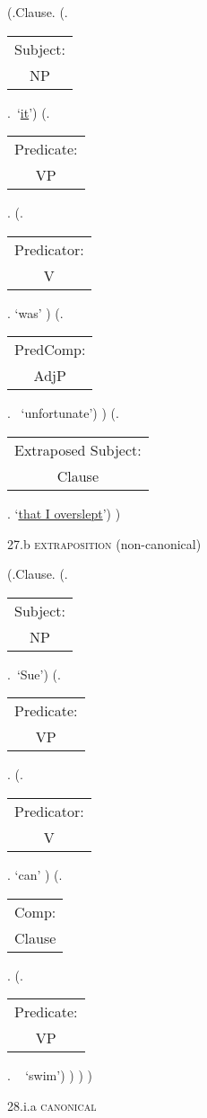 \documentclass[12pt,letterpaper]{article}
\begin{document}
\begin{figure}
	\begin{center}
		\begin{parsetree}
			(.Clause.
			(.\begin{tabular}{c}Subject:\\NP\end{tabular}.~`\underline{it}')
			(.\begin{tabular}{c}Predicate:\\VP\end{tabular}.
			(.\begin{tabular}{c}Predicator:\\V\end{tabular}. `was' )
			(.\begin{tabular}{c}PredComp:\\AdjP\end{tabular}. ~`unfortunate')
			)
			(.\begin{tabular}{c}Extraposed Subject:\\Clause\end{tabular}. `\underline{that I overslept}')
			)
			
			\hfill \break\hfill \break
		\end{parsetree}
		27.b \textsc{extraposition} (non-canonical)
	\end{center}
\end{figure}
\clearpage
\begin{figure}
	\begin{center}
		\begin{parsetree}
			(.Clause.
			(.\begin{tabular}{c}Subject:\\NP\end{tabular}.~`Sue')
			(.\begin{tabular}{c}Predicate:\\VP\end{tabular}.
			(.\begin{tabular}{c}Predicator:\\V\end{tabular}. `can' )
			(.\begin{tabular}{c}Comp:\\Clause\end{tabular}.
			(.\begin{tabular}{c}Predicate:\\VP\end{tabular}. ~ `swim')
			)
			)
			)
			
			\hfill \break\hfill \break
		\end{parsetree}
		28.i.a \textsc{canonical}
	\end{center}
\end{figure}
\end{document}
